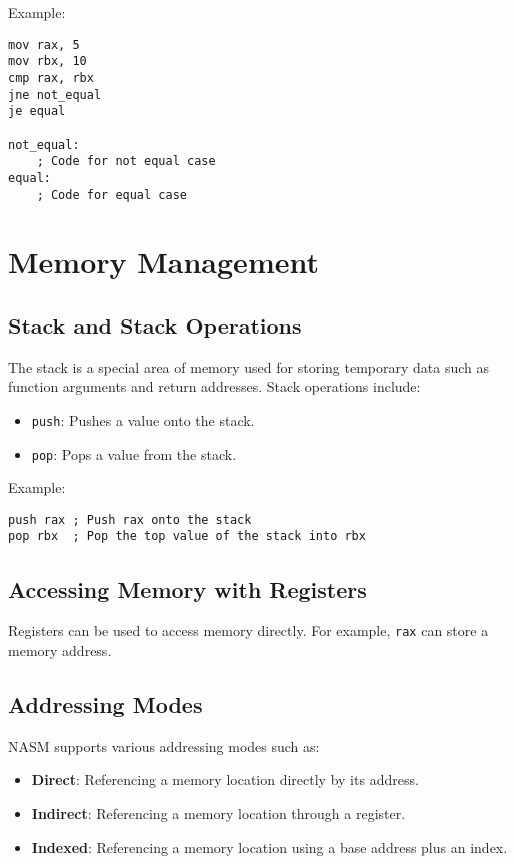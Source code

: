 \documentclass{article}
\begin{document}
Example:
\begin{lstlisting}
mov rax, 5
mov rbx, 10
cmp rax, rbx
jne not_equal
je equal

not_equal:
    ; Code for not equal case
equal:
    ; Code for equal case
\end{lstlisting}

\section{Memory Management}

\subsection{Stack and Stack Operations}
The stack is a special area of memory used for storing temporary data such as function arguments and return addresses. Stack operations include:
\begin{itemize}
    \item \texttt{push}: Pushes a value onto the stack.
    \item \texttt{pop}: Pops a value from the stack.
\end{itemize}

Example:
\begin{lstlisting}
push rax ; Push rax onto the stack
pop rbx  ; Pop the top value of the stack into rbx
\end{lstlisting}

\subsection{Accessing Memory with Registers}
Registers can be used to access memory directly. For example, \texttt{rax} can store a memory address.

\subsection{Addressing Modes}
NASM supports various addressing modes such as:
\begin{itemize}
    \item \textbf{Direct}: Referencing a memory location directly by its address.
    \item \textbf{Indirect}: Referencing a memory location through a register.
    \item \textbf{Indexed}: Referencing a memory location using a base address plus an index.
\end{itemize}
\end{document}
